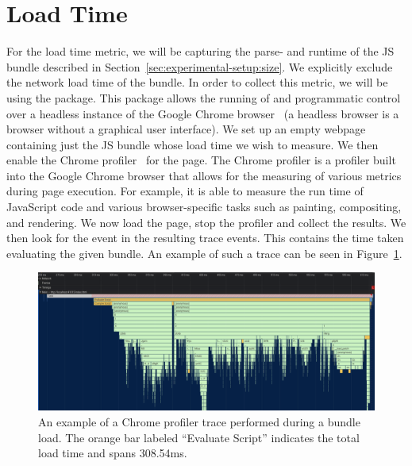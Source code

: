 \section{Load Time}\label{sec:experimental-setup:load-time}
For the load time metric, we will be capturing the parse- and runtime of the JS bundle described in Section~\ref{sec:experimental-setup:size}. We explicitly exclude the network load time of the bundle. In order to collect this metric, we will be using the  package. This package allows the running of and programmatic control over a headless instance of the Google Chrome browser~ (a headless browser is a browser without a graphical user interface). We set up an empty webpage containing just the JS bundle whose load time we wish to measure. We then enable the Chrome profiler~ for the page. The Chrome profiler is a profiler built into the Google Chrome browser that allows for the measuring of various metrics during page execution. For example, it is able to measure the run time of JavaScript code and various browser-specific tasks such as painting, compositing, and rendering. We now load the page, stop the profiler and collect the results. We then look for the  event in the resulting trace events. This contains the time taken evaluating the given bundle. An example of such a trace can be seen in Figure~\ref{fig:experimental-setup:load-time}.

\begin{figure}[h]
  \includegraphics[width=\columnwidth]{figures/experimental-setup/load-time.png}
  \caption{An example of a Chrome profiler trace performed during a bundle load. The orange bar labeled ``Evaluate Script'' indicates the total load time and spans 308.54ms.}
  \label{fig:experimental-setup:load-time}
  \centering
\end{figure}

